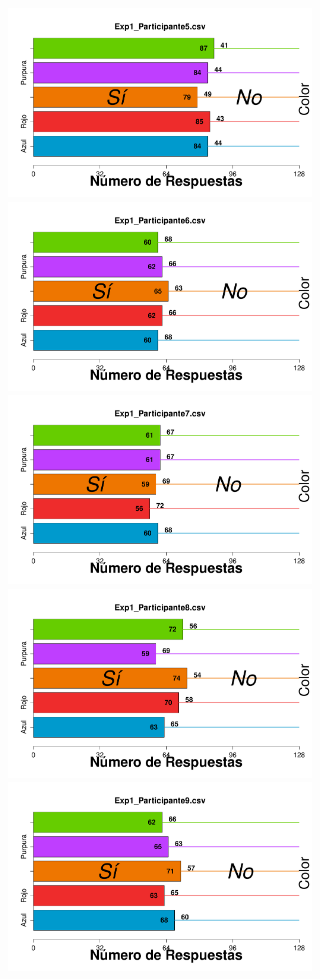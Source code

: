 \documentclass[a4paper ]{article}
\begin{document}
\begin{figure}[th]
\includegraphics[width=9cm, height=5cm]{Figures/BiasColor_Exp1_P5} \includegraphics[width=9cm, height=5cm]{Figures/BiasColor_Exp1_P6}
\includegraphics[width=9cm, height=5cm]{Figures/BiasColor_Exp1_P7} \includegraphics[width=9cm, height=5cm]{Figures/BiasColor_Exp1_P8} 
\includegraphics[width=9cm, height=5cm]{Figures/BiasColor_Exp1_P9}
\end{figure}
\end{document}
